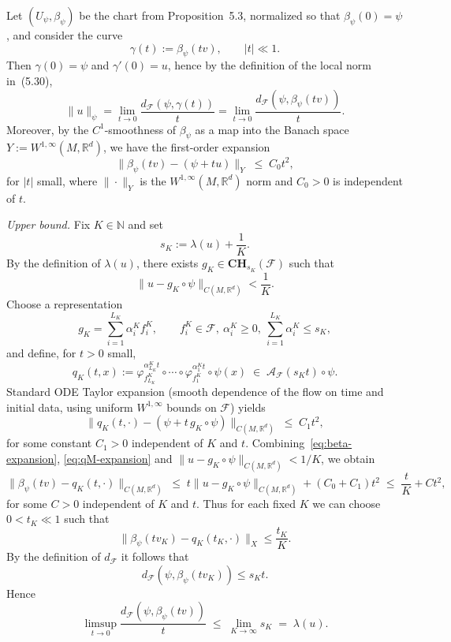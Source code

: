 \documentclass[12pt]{amsart}
\numberwithin{equation}{section}
\theoremstyle{remark}
\begin{document}
Let $(U_\psi,\beta_\psi)$ be the chart from Proposition~5.3, normalized so that
$\beta_\psi(0)=\psi$, and consider the curve
\[
\gamma(t) := \beta_\psi(tv), \qquad |t|\ll 1.
\]
Then $\gamma(0)=\psi$ and $\gamma'(0)=u$, hence by the definition of the local
norm in~(5.30),
\begin{equation}\label{eq:var-start}
  \|u\|_\psi
  = \lim_{t\to 0}\frac{d_{\mathcal F}(\psi,\gamma(t))}{t}
  = \lim_{t\to 0}\frac{d_{\mathcal F}(\psi,\beta_\psi(tv))}{t}.
\end{equation}
Moreover, by the $C^1$-smoothness of $\beta_\psi$ as a map into the Banach space $Y:=W^{1,\infty}(M, \mathbb R^d)$, we have the first-order
expansion
\begin{equation}\label{eq:beta-expansion}
  \|\beta_\psi(tv) - (\psi + t u)\|_Y \;\leq\; C_0 t^2 ,
\end{equation}
for $|t|$ small, where $\|\cdot\|_Y$ is the $W^{1,\infty}(M, \mathbb R^d)$ norm and $C_0>0$ is
independent of $t$.\medskip

\emph{Upper bound.}
Fix $K\in\mathbb N$ and set
\[
s_K := \lambda(u) + \frac{1}{K}.
\]
By the definition of $\lambda(u)$, there exists
$g_K\in \mathbf{CH}_{s_K}(\mathcal F)$ such that
\[
\|u - g_K\circ\psi\|_{C(M,\mathbb R^d)} < \frac{1}{K}.
\]
Choose a representation
\[
g_K = \sum_{i=1}^{L_K} \alpha_i^K f_i^K, \qquad f_i^K\in\mathcal F,\ \alpha_i^K\ge 0,\
\sum_{i=1}^{L_K}\alpha_i^K \le s_K,
\]
and define, for $t>0$ small,
\[
q_K(t,x)
:= \varphi^{\alpha_{L_K}^K t}_{f_{L_K}^K}
   \circ\cdots\circ
   \varphi^{\alpha_1^K t}_{f_1^K}\circ\psi(x)
\;\in\; \mathcal A_{\mathcal F}(s_K t)\circ\psi.
\]
Standard ODE Taylor expansion (smooth dependence of the flow on time and
initial data, using uniform $W^{1,\infty}$ bounds on $\mathcal F$) yields
\begin{equation}\label{eq:qM-expansion}
  \|q_K(t,\cdot) - (\psi + t\,g_K\circ\psi)\|_{C(M,\mathbb R^d)} \;\leq\; C_1 t^2 ,
\end{equation}
for some constant $C_1>0$ independent of $K$ and $t$.
Combining~\eqref{eq:beta-expansion}, \eqref{eq:qM-expansion} and
$\|u-g_K\circ\psi\|_{C(M,\mathbb R^d)}<1/K$, we obtain
\[
\|\beta_\psi(tv) - q_K(t,\cdot)\|_{C(M,\mathbb R^d)}
\;\leq\;
t\|u-g_K\circ\psi\|_{C(M,\mathbb R^d)} + (C_0+C_1)t^2
\;\leq\; \frac{t}{K} + C t^2 ,
\]
for some $C>0$ independent of $K$ and $t$. Thus for each fixed $K$ we can choose
$0<t_K\ll 1$ such that
\[
\|\beta_\psi(tv_K) - q_K(t_K,\cdot)\|_X \le \frac{t_K}{K}.
\]
By the definition of $d_{\mathcal F}$ it follows that
\[
d_{\mathcal F}(\psi,\beta_\psi(tv_K)) \le s_K t.
\]
Hence
\[
\limsup_{t\to 0}\frac{d_{\mathcal F}(\psi,\beta_\psi(tv))}{t}
\;\leq\; \lim_{K\to\infty}s_K
\;=\; \lambda(u).
\]
\end{document}
